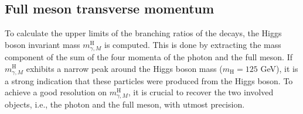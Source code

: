 \subsection{Full meson transverse momentum}

To calculate the upper limits of the branching ratios of the decays, the Higgs boson invariant mass $m^{\text{H}}_{\gamma, M}$ is computed. This is done by extracting the mass component of the sum of the four momenta of the photon and the full meson. If $m^{\text{H}}_{\gamma, M}$ exhibits a narrow peak around the Higgs boson mass ($m_\text{H} = 125$ GeV), it is a strong indication that these particles were produced from the Higgs boson. To achieve a good resolution on $m^{\text{H}}_{\gamma, M}$, it is crucial to recover the two involved objects, i.e., the photon and the full meson, with utmost precision.

